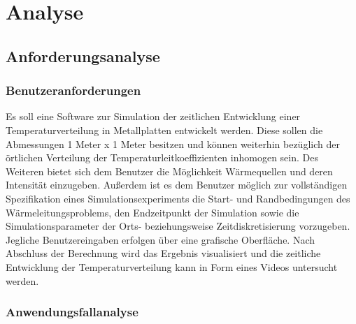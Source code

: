 \chapter{Analyse} \label{Kapitel 2}
\section{Anforderungsanalyse}

\subsection{Benutzeranforderungen}

Es soll eine Software zur Simulation der zeitlichen Entwicklung einer Temperaturverteilung in Metallplatten entwickelt werden. Diese sollen die Abmessungen 1 Meter x 1 Meter besitzen und können weiterhin bezüglich der örtlichen Verteilung der Temperaturleitkoeffizienten inhomogen sein. Des Weiteren bietet sich dem Benutzer die Möglichkeit Wärmequellen und deren Intensität einzugeben. Außerdem ist es dem Benutzer möglich zur vollständigen Spezifikation eines Simulationsexperiments die Start- und Randbedingungen des Wärmeleitungsproblems, den Endzeitpunkt der Simulation sowie die Simulationsparameter der Orts- beziehungsweise Zeitdiskretisierung vorzugeben. Jegliche Benutzereingaben erfolgen über eine grafische Oberfläche. Nach Abschluss der Berechnung wird das Ergebnis visualisiert und die zeitliche Entwicklung der Temperaturverteilung kann in Form eines Videos untersucht werden.


\subsection{Anwendungsfallanalyse} \label{Kapitel 2 Use Case Analyse}

